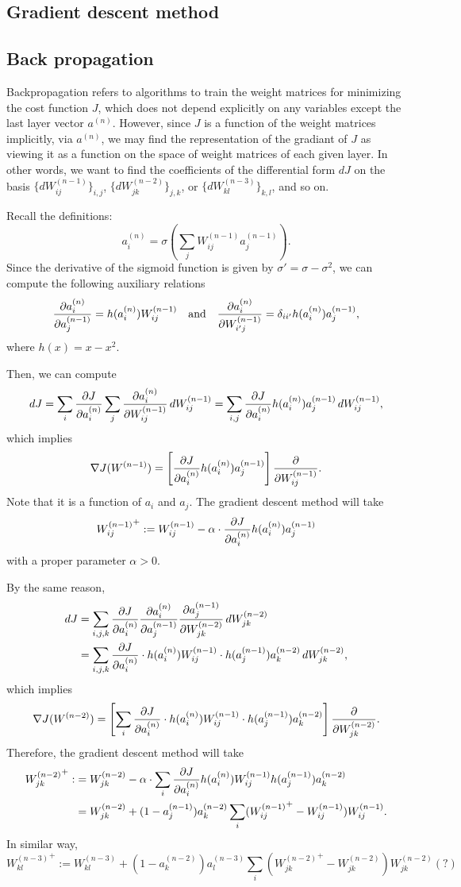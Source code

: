 \documentclass{../exp}
\begin{document}
\subsection{Gradient descent method}



\subsection{Back propagation}
Backpropagation refers to algorithms to train the weight matrices for minimizing the cost function $J$, which does not depend explicitly on any variables except the last layer vector $a^{(n)}$.
However, since $J$ is a function of the weight matrices implicitly, via $a^{(n)}$, we may find the representation of the gradiant of $J$ as viewing it as a function on the space of weight matrices of each given layer.
In other words, we want to find the coefficients of the differential form $dJ$ on the basis $\{dW_{ij}^{(n-1)}\}_{i,j}$, $\{dW_{jk}^{(n-2)}\}_{j,k}$, or $\{dW_{kl}^{(n-3)}\}_{k,l}$, and so on.

Recall the definitions:
\[a_i^{(n)}=\sigma\left(\sum_jW_{ij}^{(n-1)}a_j^{(n-1)}\right).\]
Since the derivative of the sigmoid function is given by $\sigma'=\sigma-\sigma^2$, we can compute the following auxiliary relations
\[\pd{a_i^{(n)}}{a_j^{(n-1)}}=h(a_i^{(n)})W_{ij}^{(n-1)}\c{and}\pd{a_i^{(n)}}{W_{i'j}^{(n-1)}}=\delta_{ii'}h(a_i^{(n)})a_j^{(n-1)},\]
where $h(x)=x-x^2$.

Then, we can compute
\[dJ=\sum_i\pd{J}{a_i^{(n)}}\sum_j\pd{a_i^{(n)}}{W_{ij}^{(n-1)}}\,dW_{ij}^{(n-1)}=\sum_{i,j}\pd{J}{a_i^{(n)}}h(a_i^{(n)})a_j^{(n-1)}\,dW_{ij}^{(n-1)},\]
which implies
\[\del J(W^{(n-1)})=\left[\pd{J}{a_i^{(n)}}h(a_i^{(n)})a_j^{(n-1)}\right]\pd{W_{ij}^{(n-1)}}.\]
Note that it is a function of $a_i$ and $a_j$.
The gradient descent method will take
\[{W_{ij}^{(n-1)}}^+:=W_{ij}^{(n-1)}-\alpha\cdot\pd{J}{a_i^{(n)}}h(a_i^{(n)})a_j^{(n-1)}\]
with a proper parameter $\alpha>0$.

By the same reason,
\begin{align*}
dJ&=\sum_{i,j,k}\pd{J}{a_i^{(n)}}\pd{a_i^{(n)}}{a_j^{(n-1)}}\pd{a_j^{(n-1)}}{W_{jk}^{(n-2)}}\,dW_{jk}^{(n-2)}\\
&=\sum_{i,j,k}\pd{J}{a_i^{(n)}}\cdot h(a_i^{(n)})W_{ij}^{(n-1)}\cdot h(a_j^{(n-1)})a_k^{(n-2)}\,dW_{jk}^{(n-2)},
\end{align*}
which implies
\[\del J(W^{(n-2)})=\left[\sum_i\pd{J}{a_i^{(n)}}\cdot h(a_i^{(n)})W_{ij}^{(n-1)}\cdot h(a_j^{(n-1)})a_k^{(n-2)}\right]\pd{W_{jk}^{(n-2)}}.\]
Therefore, the gradient descent method will take
\begin{align*}
{W_{jk}^{(n-2)}}^+:&=W_{jk}^{(n-2)}-\alpha\cdot\sum_i\pd{J}{a_i^{(n)}}h(a_i^{(n)})W_{ij}^{(n-1)}h(a_j^{(n-1)})a_k^{(n-2)}\\
&=W_{jk}^{(n-2)}+(1-a_j^{(n-1)})a_k^{(n-2)}\sum_i({W_{ij}^{(n-1)}}^+-W_{ij}^{(n-1)})W_{ij}^{(n-1)}.
\end{align*}
In similar way,
\[{W_{kl}^{(n-3)}}^+:=W_{kl}^{(n-3)}+(1-a_k^{(n-2)})a_l^{(n-3)}\sum_i({W_{jk}^{(n-2)}}^+-W_{jk}^{(n-2)})W_{jk}^{(n-2)}(?)\]
\end{document}
